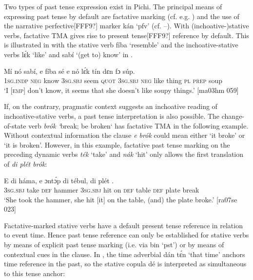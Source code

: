Two types of past tense expression exist in Pichi. The principal means of expressing past tense by default are factative marking (cf. e.g. ) and the use of the narrative perfective[FFF9?] marker kán ‘pfv’ (cf. –). With (inchoative-)stative verbs, factative TMA gives rise to present tense[FFF9?] reference by default. This is illustrated in  with the stative verb fíba ‘resemble’ and the inchoative-stative verbs lɛ́k ‘like’ and sabí ‘(get to) know’ in . 


\ea%
    \label{ex:key:378}
    \gll Mí    nó  sabí,  e    fíba    sé    e    nó  lɛ́k
tín     dɛn  fɔ  súp.\\
\textsc{1sg.indp}  \textsc{neg}  know  \textsc{3sg.sbj}  seem  \textsc{quot}    \textsc{3sg.sbj}  \textsc{neg}  like
thing   \textsc{pl}  \textsc{prep}  soup\\

\glt ‘I \textsc{[emp]} don’t know, it seems that she doesn’t like soupy things.’ [ma03hm 059]
\z

If, on the contrary, pragmatic context suggests an inchoative reading of inchoative-stative verbs, a past tense interpretation is also possible. The change-of-state verb \textit{brók ‘}break; be broken‘ has factative TMA in the following example. Without contextual information the clause \textit{e brók} could mean either ‘it broke’ or ‘it is broken’. However, in this example, factative past tense marking on the preceding dynamic verbs \textit{ték} ‘take’ and \textit{nák} ‘hit’ only allows the first translation of \textit{di plét brók}: 


\ea%
    \label{ex:key:379}
    \gll E        di  háma,  e      ɔntɔ́p  di  tébul,
di  plét    .\\
\textsc{3sg.sbj}  take    \textsc{def}  hammer  \textsc{3sg.sbj}  hit  on    \textsc{def}  table
\textsc{def}  plate  break\\

\glt ‘She took the hammer, she hit [it] on the table, (and) the plate broke.’ [ra07se 023]
\z

Factative-marked stative verbs have a default present tense reference in relation to event time. Hence past tense reference can only be established for stative verbs by means of explicit past tense marking (i.e. via bin ‘pst’) or by means of contextual cues in the clause. In , the time adverbial dán tɛ́n ‘that time’ anchors time reference in the past, so the stative copula dé is interpreted as simultaneous to this tense anchor:


